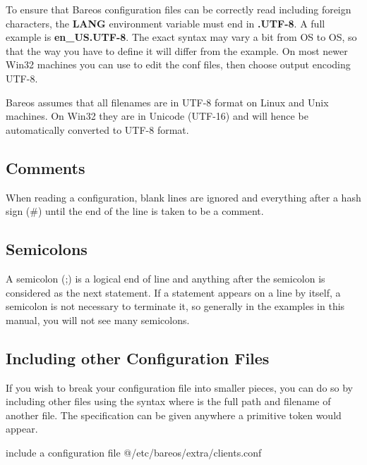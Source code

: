 To ensure that Bareos configuration files can be correctly read including
foreign characters, the {\bf LANG} environment variable
must end in {\bf .UTF-8}. A full example is {\bf en\_US.UTF-8}. The
exact syntax may vary a bit from OS to OS, so that the way you have to define
it will differ from the example.  On most newer Win32 machines you can use 
to edit the conf files, then choose output encoding UTF-8.

Bareos assumes that all filenames are in UTF-8 format on Linux and
Unix machines. On Win32 they are in Unicode (UTF-16) and will hence
be automatically converted to UTF-8 format.

\subsection{Comments}
\label{Comments}

When reading a configuration, blank lines are ignored and everything
after a hash sign (\#) until the end of the line is taken to be a comment.

\subsection{Semicolons}
A semicolon (;) is a logical end of line and anything after the semicolon is
considered as the next statement. If a statement appears on a line by itself,
a semicolon is not necessary to terminate it, so generally in the examples in
this manual, you will not see many semicolons.

\subsection{Including other Configuration Files}
\label{Includes}

If you wish to break your configuration file into smaller pieces, you can do
so by including other files using the syntax 
where  is the full path and filename of another file.
The 
specification can be given anywhere a primitive token would appear.

\begin{bconfig}{include a configuration file}
@/etc/bareos/extra/clients.conf
\end{bconfig}

